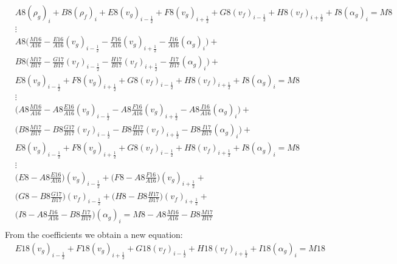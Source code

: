 \documentclass[11pt,letterpaper,titlepage]{article}
\newcommand{\half}{\frac{1}{2}}
\begin{document}
\begin{equation*}
\begin{aligned}
&A8(\rho_g)_i  + B8(\rho_f)_i  + E8   (v_g)_{i-\half}  + F8(v_g)_{i+\half} + G8   (v_f)_{i-\half} + H8 (v_f)_{i+\half} + I8(\alpha_g)_i   =M8  \\ 
&\vdots\\
&A8\biggr( \frac{M16}{A16} - \frac{E16}{A16}  (v_g)_{i-\half}  - \frac{F16}{A16}  (v_g)_{i+\half} - \frac{I16}{A16}(\alpha_g)_i \biggr)  +\\
&B8\biggr( \frac{M17}{B17} - \frac{G17}{B17}  (v_f)_{i-\half}  - \frac{H17}{B17}  (v_f)_{i+\half} - \frac{I17}{B17}(\alpha_g)_i \biggr)  + \\
&E8   (v_g)_{i-\half}  + F8(v_g)_{i+\half} + G8   (v_f)_{i-\half} + H8 (v_f)_{i+\half} + I8(\alpha_g)_i   =M8  \\ 
&\vdots\\
&\biggr( A8\frac{M16}{A16} - A8\frac{E16}{A16}  (v_g)_{i-\half}  - A8\frac{F16}{A16}  (v_g)_{i+\half} - A8\frac{I16}{A16}(\alpha_g)_i \biggr)  +\\
&\biggr( B8\frac{M17}{B17} - B8\frac{G17}{B17}  (v_f)_{i-\half}  - B8\frac{H17}{B17}  (v_f)_{i+\half} - B8\frac{I17}{B17}(\alpha_g)_i \biggr)  + \\
&E8   (v_g)_{i-\half}  + F8(v_g)_{i+\half} + G8   (v_f)_{i-\half} + H8 (v_f)_{i+\half} + I8(\alpha_g)_i   =M8  \\ 
&\vdots\\
&\biggr( E8 - A8\frac{E16}{A16} \biggr)(v_g)_{i-\half}  + 
 \biggr( F8 - A8\frac{F16}{A16} \biggr)(v_g)_{i+\half} + \\
&\biggr( G8 - B8\frac{G17}{B17} \biggr)(v_f)_{i-\half} + 
 \biggr( H8 - B8\frac{H17}{B17} \biggr)(v_f)_{i+\half} + \\
&\biggr( I8 - A8\frac{I16}{A16} - B8\frac{I17}{B17} \biggr)(\alpha_g)_i   
=M8 -  A8\frac{M16}{A16} - B8\frac{M17}{B17} \\ 
\end{aligned}
\end{equation*}
\newline
\noindent
From the coefficients we obtain a new equation:
\begin{equation}
\begin{aligned}
&E18(v_g)_{i-\half} + F18(v_g)_{i+\half} + G18(v_f)_{i-\half} + H18(v_f)_{i+\half} + I18(\alpha_g)_i  = M18 \\ 
\end{aligned}
\end{equation}
\end{document}
